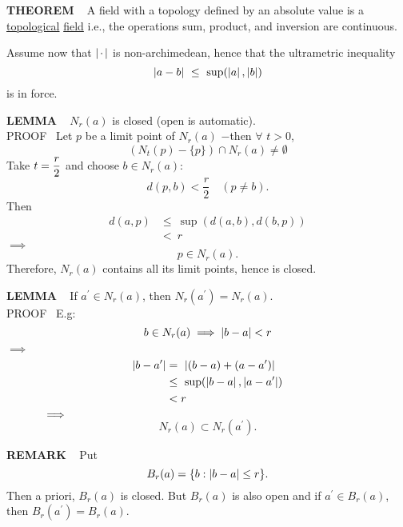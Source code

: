 \begin{x}{\small\bf THEOREM} \ %
A field with a topology defined by an absolute value is a 
\underline{topological} \underline{field} 
i.e., the operations sum, product, and inversion are continuous.\\
\end{x}
\vspace{0.1cm}

Assume now that $\left\vert\hspace{0.05cm} \cdot \hspace{0.05cm}\right\vert$  is non-archimedean, hence that the ultrametric inequality 
\[
\left\vert a - b\right\vert \ \le \  \sup (\left\vert a\right\vert,\left\vert b\right\vert)
\]
is in force.\\

\begin{x}{\small\bf LEMMA} \ %
$N_r(a)$ is closed (open is automatic).\\

\indent PROOF \   Let $p$ be a limit point of $N_r(a)$ $-$then $\forall$  $t > 0$,
\[
(N_t(p) - \{p\}) \cap N_r(a) \ne \emptyset
\]
Take $t = \displaystyle\frac{r}{2}$ and choose $b \in N_r(a):$
\[
d(p,b) < \frac{r}{2}	\quad \text{$(p \ne b)$}.
\]
Then
\[
\begin{aligned}
d(a,p) 
&\le  \ \sup(d(a,b), d(b,p)) \\
&< \  r
\end{aligned}
\]
$\implies$
\[
p \in N_r(a).
\]
Therefore, $N_r(a)$ contains all its limit points, hence is closed.\\
\end{x}

\begin{x}{\small\bf LEMMA} \ %
If $a^{\prime} \in N_r(a)$, then $N_r(a^{\prime} ) = N_r(a)$.\\

PROOF \  E.g:
\[
b \in N_r(a) \implies \left\vert b - a\right\vert < r
\]
$\implies$
\[
\begin{aligned}
\abs{b - a^{\prime}} 
&= \  \abs{(b - a) + (a - a^{\prime})}\\
&\le \  \sup(\abs{b - a},\abs{a - a^{\prime}})\\
&< r %
\end{aligned}
\]
$\indent\indent\implies$ 
\[
N_r(a) \subset N_r(a^{\prime}).
\]
\end{x}

\begin{x}{\small\bf REMARK} \ %
Put
\[
B_r(a) = \{b:\left\vert b - a\right\vert \le r\}.
\]
Then a priori, $B_r(a)$ is closed.  But $B_r(a)$ is also open and if $a^{\prime} \in B_r(a)$, then  $B_r(a^{\prime}) = B_r(a)$.
\end{x}
\vspace{0.1cm}

